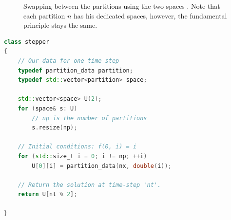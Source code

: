 \begin{figure}[tb]
\centering
{}
\caption{Swapping between the partitions using the two spaces . Note that each partition $n$ has his dedicated spaces, however, the fundamental principle stays the same.}
\label{heat:swapping:partition}
\end{figure}



\begin{lstlisting}[language=c++,caption={Serial implementation of the one-dimensional heat equation with grain size control. \label{code:heat:grain:size:stepper}},float,floatplacement=tbp]
class stepper
{
    // Our data for one time step
    typedef partition_data partition;
    typedef std::vector<partition> space;
    
    std::vector<space> U(2);
    for (space& s: U)
        // np is the number of partitions
        s.resize(np);
        
    // Initial conditions: f(0, i) = i
    for (std::size_t i = 0; i != np; ++i)
        U[0][i] = partition_data(nx, double(i));
        
    // Return the solution at time-step 'nt'.
    return U[nt % 2];
    
}
\end{lstlisting}


\newpage
\theendnotes
